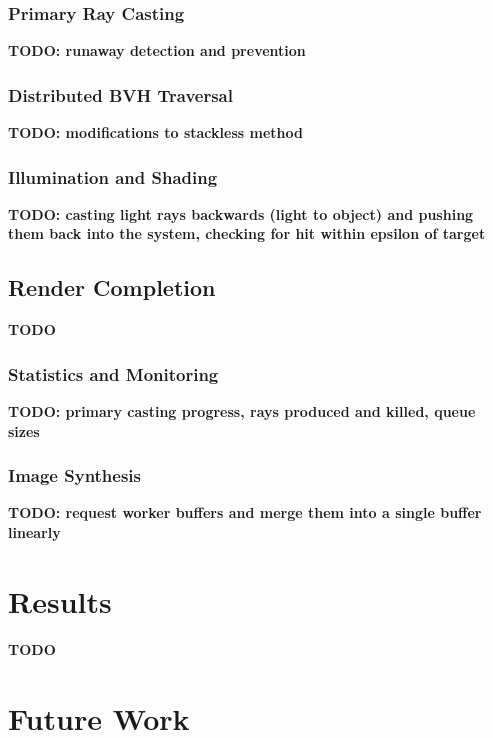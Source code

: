 \documentclass[12pt]{ucthesis}
\begin{document}
\subsection{Primary Ray Casting}
\label{primaryrays}

\textbf{TODO: runaway detection and prevention}

\subsection{Distributed BVH Traversal}
\label{traversal}

\textbf{TODO: modifications to stackless method}

\subsection{Illumination and Shading}
\label{shading}

\textbf{TODO: casting light rays backwards (light to object) and pushing them back into the system, checking for hit within epsilon of target}

\section{Render Completion}
\label{completion}

\textbf{TODO}

\subsection{Statistics and Monitoring}
\label{stats}

\textbf{TODO: primary casting progress, rays produced and killed, queue sizes}

\subsection{Image Synthesis}
\label{synthesis}

\textbf{TODO: request worker buffers and merge them into a single buffer linearly}

\chapter{Results}
\label{results}

\textbf{TODO}

\chapter{Future Work}
\label{futurework}
\end{document}
